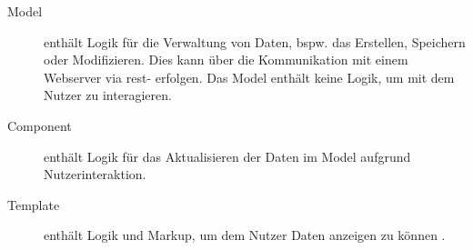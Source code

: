 \begin{description}
	\item[Model] enthält Logik für die Verwaltung von Daten, bspw. das Erstellen, Speichern oder Modifizieren. Dies kann über die Kommunikation mit einem Webserver via \acs{rest}- erfolgen. Das Model enthält keine Logik, um mit dem Nutzer zu interagieren.
	\item[Component] enthält Logik für das Aktualisieren der Daten im Model aufgrund Nutzerinteraktion.
	\item[Template] enthält Logik und Markup, um dem Nutzer Daten anzeigen zu können \cite{ProAngular}.
\end{description}

%
